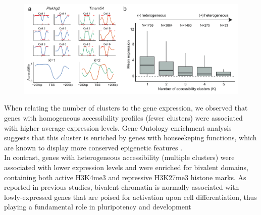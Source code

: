 \begin{figure}[H]
	\centering
	\includegraphics[width=0.9\linewidth]{scNMT_profiles_clusters}
	\caption[]{}
	\label{fig:scnmt_profiles_clusters}
\end{figure}



When relating the number of clusters to the gene expression, we observed that genes with homogeneous accessibility profiles (fewer clusters) were associated with higher average expression levels. Gene Ontology enrichment analysis suggests that this cluster is enriched by genes with houseekeping functions, which are known to display more conserved epigenetic features \cite{She2009}.\\
In contrast, genes with heterogeneous accessibility (multiple clusters) were associated with lower expression levels and were enriched for bivalent domains, containing both active H3K4me3 and repressive H3K27me3 histone marks. As reported in previous studies, bivalent chromatin is normally associated with lowly-expressed genes that are poised for activation upon cell differentiation, thus playing a fundamental role in pluripotency and development \cite{Vastenhouw2012,Bernstein2006}

